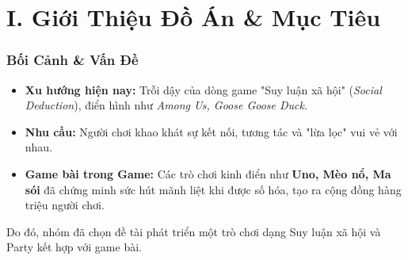 \section{I. Giới Thiệu Đồ Án \& Mục Tiêu}

\begin{frame}
\frametitle{Bối Cảnh \& Vấn Đề}
\begin{itemize}
    \item \textbf{Xu hướng hiện nay:} Trỗi dậy của dòng game "Suy luận xã hội" (\textit{Social Deduction}), điển hình như \textit{Among Us, Goose Goose Duck}.
    \item \textbf{Nhu cầu:} Người chơi khao khát sự kết nối, tương tác và "lừa lọc" vui vẻ với nhau.
    
    \item \textbf{Game bài trong Game:} Các trò chơi kinh điển như \textbf{Uno, Mèo nổ, Ma sói} đã chứng minh sức hút mãnh liệt khi được số hóa, tạo ra cộng đồng hàng triệu người chơi.
\end{itemize}
\vspace{0.5cm}
    Do đó, nhóm đã chọn đề tài phát triển một trò chơi dạng Suy luận xã hội và Party kết hợp với game bài.
\end{frame}

